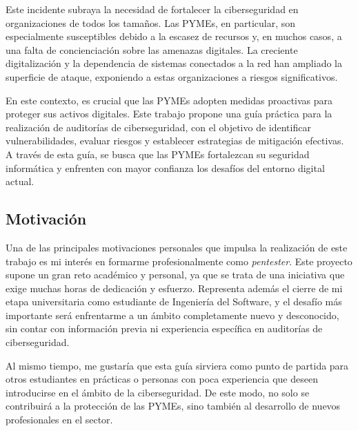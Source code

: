 \documentclass[a4paper, 11pt]{article}
\begin{document}
Este incidente subraya la necesidad de fortalecer la ciberseguridad en organizaciones de todos los tamaños. Las PYMEs, en particular, son especialmente susceptibles debido a la escasez de recursos y, en muchos casos, a una falta de concienciación sobre las amenazas digitales. 
La creciente digitalización y la dependencia de sistemas conectados a la red han ampliado la superficie de ataque, exponiendo a estas organizaciones a riesgos significativos.
\par\vspace{0.5cm}

En este contexto, es crucial que las PYMEs adopten medidas proactivas para proteger sus activos digitales. Este trabajo propone una guía práctica para la realización de auditorías de ciberseguridad, con el objetivo de identificar vulnerabilidades, evaluar riesgos y establecer 
estrategias de mitigación efectivas. A través de esta guía, se busca que las PYMEs fortalezcan su seguridad informática y enfrenten con mayor confianza los desafíos del entorno digital actual.
\par\vspace{0.5cm}


\subsection{Motivación}
\par\vspace{0.5cm}

Una de las principales motivaciones personales que impulsa la realización de este trabajo es mi interés en formarme profesionalmente como \textit{pentester}. Este proyecto supone un gran reto académico y personal, ya que se trata de una iniciativa que exige muchas horas de dedicación y esfuerzo. Representa además el cierre de mi etapa universitaria como estudiante de Ingeniería del Software, y el desafío más importante será enfrentarme a un ámbito completamente nuevo y desconocido, sin contar con información previa ni experiencia específica en auditorías de ciberseguridad. 
\par\vspace{0.5cm}

Al mismo tiempo, me gustaría que esta guía sirviera como punto de partida para otros estudiantes en prácticas o personas con poca experiencia que deseen introducirse en el ámbito de la ciberseguridad. De este modo, no solo se contribuirá a la protección de las PYMEs, sino también al desarrollo de nuevos profesionales en el sector.
\end{document}
